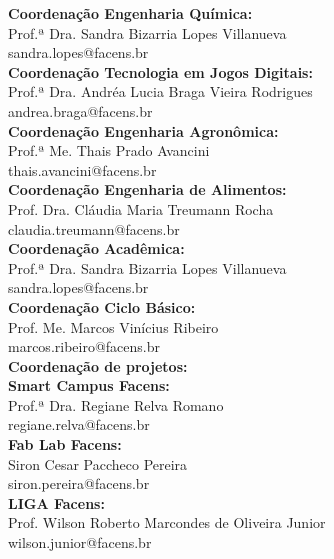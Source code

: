 \documentclass[
	12pt,				%
	oneside,			%
	a4paper,			%
	chapter=TITLE,		%
	section=TITLE,		%
	sumario=tradicional %
	english,			%
	french,				%
	spanish,			%
	brazil				%
	]{abntex2}
\begin{document}
\textbf{Coordenação Engenharia Química:} \\ \indent Prof.ª Dra. Sandra Bizarria Lopes Villanueva \\
\indent sandra.lopes@facens.br \\

\textbf{Coordenação Tecnologia em Jogos Digitais:} \\ \indent Prof.ª Dra. Andréa Lucia Braga Vieira Rodrigues \\
\indent andrea.braga@facens.br \\

\textbf{Coordenação Engenharia Agronômica:} \\ \indent Prof.ª Me. Thais Prado Avancini \\
\indent thais.avancini@facens.br \\

\textbf{Coordenação Engenharia de Alimentos:} \\ \indent Prof. Dra. Cláudia Maria Treumann Rocha \\
\indent claudia.treumann@facens.br \\

\textbf{Coordenação Acadêmica:} \\ \indent Prof.ª Dra. Sandra Bizarria Lopes Villanueva \\
\indent sandra.lopes@facens.br \\

\textbf{Coordenação Ciclo Básico:} \\ \indent Prof. Me. Marcos Vinícius Ribeiro \\
\indent marcos.ribeiro@facens.br \\

\textbf{Coordenação de projetos:}  \\

\textbf{Smart Campus Facens:} \\ \indent Prof.ª Dra. Regiane Relva Romano \\
\indent regiane.relva@facens.br \\

\textbf{Fab Lab Facens:} \\ \indent Siron Cesar Paccheco Pereira \\
\indent siron.pereira@facens.br \\

\textbf{LIGA Facens:} \\ \indent Prof. Wilson Roberto Marcondes de Oliveira Junior \\
\indent wilson.junior@facens.br \\
\end{document}
